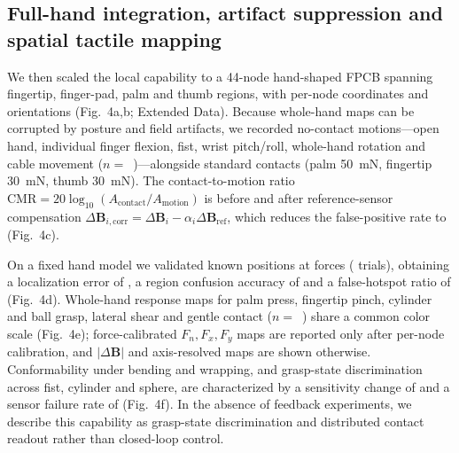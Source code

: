 \subsection*{Full-hand integration, artifact suppression and spatial tactile mapping}
We then scaled the local capability to a 44-node hand-shaped FPCB spanning
fingertip, finger-pad, palm and thumb regions, with per-node coordinates and
orientations (Fig.~4a,b; Extended Data). Because whole-hand maps can be
corrupted by posture and field artifacts, we recorded no-contact
motions---open hand, individual finger flexion, fist, wrist pitch/roll,
whole-hand rotation and cable movement
($n=$~)---alongside standard
contacts (palm 50~mN, fingertip 30~mN, thumb 30~mN). The contact-to-motion
ratio $\mathrm{CMR}=20\log_{10}(A_{\mathrm{contact}}/A_{\mathrm{motion}})$
is  before and
 after reference-sensor compensation
$\Delta\mathbf{B}_{i,\mathrm{corr}}=\Delta\mathbf{B}_i-\alpha_i
\Delta\mathbf{B}_{\mathrm{ref}}$, which reduces the false-positive rate to
 (Fig.~4c).

On a fixed hand model we validated 
known positions at  forces
( trials), obtaining a localization error of
, a region confusion accuracy of
 and a false-hotspot ratio of
 (Fig.~4d). Whole-hand response maps for palm
press, fingertip pinch, cylinder and ball grasp, lateral shear and gentle
contact ($n=$~) share a common
color scale (Fig.~4e); force-calibrated $F_n,F_x,F_y$ maps are reported only
after per-node calibration, and $|\Delta\mathbf{B}|$ and axis-resolved maps
are shown otherwise. Conformability under bending and wrapping, and
grasp-state discrimination across fist, cylinder and sphere, are
characterized by a sensitivity change of
 and a sensor failure rate
of  (Fig.~4f). In the
absence of feedback experiments, we describe this capability as grasp-state
discrimination and distributed contact readout rather than closed-loop
control.

